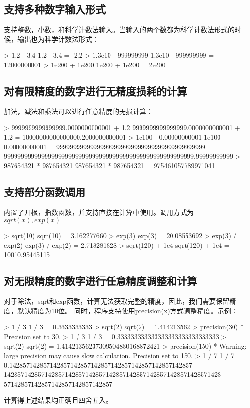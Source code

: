 \documentclass[11pt]{article}
\begin{document}
\subsection{支持多种数字输入形式}
支持整数，小数，和科学计数法输入。当输入的两个数都为科学计数法形式的时候，输出也为科学计数法形式：
\begin{commandline}
> 1.2 - 3.4
1.2 - 3.4 = -2.2
> 1.3e10 - 999999999
1.3e10 - 999999999 = 12000000001
> 1e200 + 1e200
1e200 + 1e200 = 2e200
\end{commandline}

\subsection{对有限精度的数字进行无精度损耗的计算}
加法，减法和乘法可以进行任意精度的无损计算：
\begin{commandline}
> 9999999999999999.0000000000001 + 1.2
9999999999999999.0000000000001 + 1.2 = 10000000000000000.2000000000001
> 1e100 - 0.00000000001
1e100 - 0.00000000001 = 99999999999999999999999999999999999999999999
99999999999999999999999999999999999999999999999999999999.99999999999
> 987654321 * 987654321
987654321 * 987654321 = 975461057789971041
\end{commandline}

\subsection{支持部分函数调用}
内置了开根，指数函数，并支持直接在计算中使用。调用方式为$sqrt(x),exp(x)$
\begin{commandline}
> sqrt(10)
sqrt(10) = 3.162277660   			
> exp(3)   		
exp(3) = 20.08553692				
> exp(3) / exp(2)
exp(3) / exp(2) = 2.718281828 		
> sqrt(120) + 1e4
sqrt(120) + 1e4 = 10010.95445115 
\end{commandline}

\subsection{对无限精度的数字进行任意精度调整和计算}
对于除法，sqrt和exp函数，计算无法获取完整的精度，因此，我们需要保留精度，默认精度为10位。
同时，程序支持使用precision(x)方式调整精度。示例：
\begin{commandline}
> 1 / 3  
1 / 3 = 0.3333333333
> sqrt(2)
sqrt(2) = 1.414213562
> precision(30)
* Precision set to 30.
> 1 / 3         
1 / 3 = 0.333333333333333333333333333333
> sqrt(2)
sqrt(2) = 1.41421356237309504880168872421
> precision(150) 
* Warning: large precision may cause slow calculation.
Precision set to 150.
> 1 / 7
1 / 7 = 0.142857142857142857142857142857142857142857142857142857
1428571428571428571428571428571428571428571428571428571428571428
57142857142857142857142857142857
\end{commandline}
计算得上述结果均正确且四舍五入。
\end{document}
